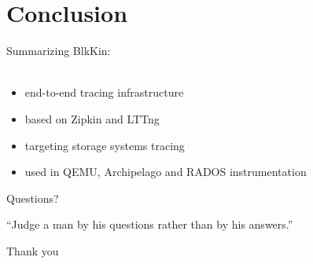 \section{Conclusion}

\begin{frame}{Summarizing}
BlkKin:
\hfill \\
\hfill \\
\begin{itemize}
\item end-to-end tracing infrastructure
\item based on Zipkin and LTTng
\item targeting storage systems tracing
\item used in QEMU, Archipelago and RADOS instrumentation
\end{itemize}
\end{frame}

\begin{frame}{Questions?}
\begin{exampleblock}{}
  {``Judge a man by his questions rather than by his answers.''}
  \vskip5mm
  \hspace*{}
\end{exampleblock}
\end{frame}

\begin{frame}
\begin{center}
{\Large Thank you }
\end{center}
\end{frame}
